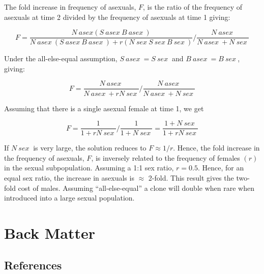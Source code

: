 \documentclass[
  letterpaper,
]{scrbook}
\newlength{\cslhangindent}
\newlength{\cslentryspacingunit} %
\newenvironment{CSLReferences}[2] %
 {%
  \setlength{\parindent}{0pt}
  \ifodd #1
  \let\oldpar\par
  \def\par{\hangindent=\cslhangindent\oldpar}
  \fi
  \setlength{\parskip}{#2\cslentryspacingunit}
 }%
 {}
\begin{document}
\begin{tcolorbox}
The fold increase in frequency of asexuals, \(F\), is the ratio of the
frequency of asexuals at time 2 divided by the frequency of asexuals at
time 1 giving:

\[F = \frac{N~asex(S~asex~B~asex~)}{N~asex~(S~asex~B~asex~) + r(N~sex~S~sex~B~sex~)}/\frac{N~asex~}{N~asex~ + N~sex~}\]

Under the all-else-equal assumption, \(S~asex~ = S~sex~\) and
\(B~asex~ = B~sex~\), giving:

\[F = \frac{N~asex~}{N~asex~ + rN~sex~}/\frac{N~asex~}{N~asex~ + N~sex~}\]

Assuming that there is a single asexual female at time 1, we get

\[F = \frac{1}{1 + rN~sex~}/\frac{1}{1 + N~sex~} = \frac{1 + N~sex~}{1 + rN~sex~}\]

If \(N~sex~\) is very large, the solution reduces to \(F \approx 1/r\).
Hence, the fold increase in the frequency of asexuals, \(F\), is
inversely related to the frequency of females \((r)\) in the sexual
subpopulation. Assuming a 1:1 sex ratio, \(r = 0.5\). Hence, for an
equal sex ratio, the increase in asexuals is \(\approx\) 2-fold. This
result gives the two-fold cost of males. Assuming ``all-else-equal'' a
clone will double when rare when introduced into a large sexual
population.

\end{tcolorbox}


\part{Back Matter}

\hypertarget{references}{%
\chapter*{References}\label{references}}


\hypertarget{refs}{}
\begin{CSLReferences}{0}{0}
\end{CSLReferences}


\backmatter
\end{document}
